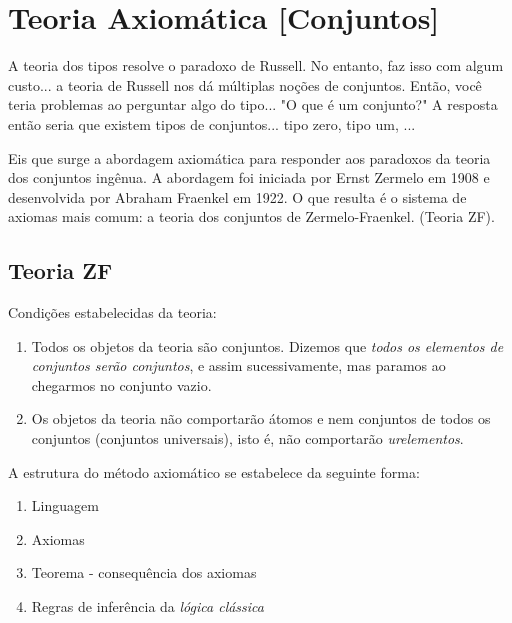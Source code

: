 \section{Teoria Axiomática [Conjuntos]}
   A teoria dos tipos resolve o paradoxo de Russell. No entanto, faz isso 
   com algum custo... a teoria de Russell nos dá múltiplas noções de conjuntos.
   Então, você teria problemas ao perguntar algo do tipo... "O que é um 
   conjunto?" A resposta então seria que existem tipos de conjuntos... 
   tipo zero, tipo um, ...\newline

   Eis que surge a abordagem axiomática para responder aos paradoxos da teoria 
   dos conjuntos ingênua. A abordagem foi iniciada por Ernst Zermelo em 1908 e 
   desenvolvida por Abraham Fraenkel em 1922. O que resulta é o sistema de 
   axiomas mais comum: a teoria dos conjuntos de Zermelo-Fraenkel. (Teoria 
   ZF).
   \subsection{Teoria ZF}
      Condições estabelecidas da teoria:
      \begin{enumerate}
         \item Todos os objetos da teoria são conjuntos. Dizemos que \emph{todos os 
            elementos de conjuntos serão conjuntos}, e assim sucessivamente, mas paramos 
            ao chegarmos no conjunto vazio.
        \item Os objetos da teoria não comportarão átomos e nem conjuntos de todos 
           os conjuntos (conjuntos universais), isto é, não comportarão 
           \emph{urelementos}.
      \end{enumerate}
      A estrutura do método axiomático se estabelece da seguinte forma:
      \begin{enumerate}
         \item Linguagem
         \item Axiomas
         \item Teorema - consequência dos axiomas
         \item Regras de inferência da \emph{lógica clássica}
      \end{enumerate}

